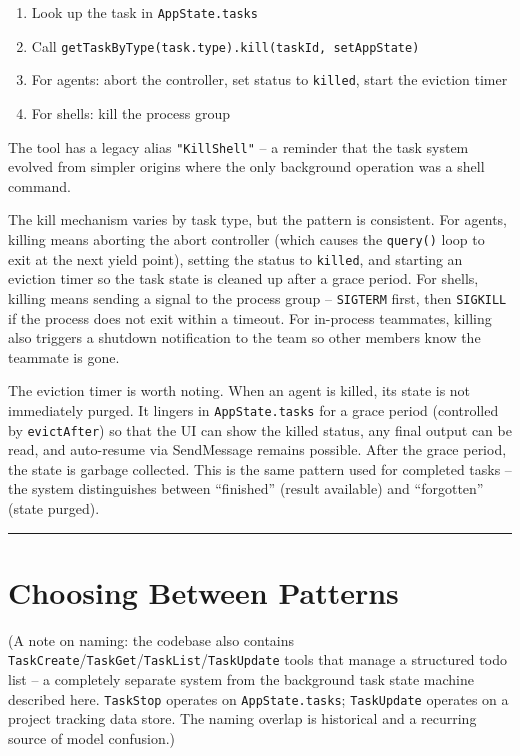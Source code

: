 \documentclass[
  english,
  11pt,
  letterpaper,
]{book}
\providecommand{\tightlist}{%
  \setlength{\itemsep}{0pt}\setlength{\parskip}{0pt}}
\begin{document}
\begin{enumerate}
\def\labelenumi{\arabic{enumi}.}
\tightlist
\item
  Look up the task in \texttt{AppState.tasks}
\item
  Call \texttt{getTaskByType(task.type).kill(taskId,\ setAppState)}
\item
  For agents: abort the controller, set status to
  \texttt{\textquotesingle{}killed\textquotesingle{}}, start the
  eviction timer
\item
  For shells: kill the process group
\end{enumerate}

The tool has a legacy alias \texttt{"KillShell"} -- a reminder that the
task system evolved from simpler origins where the only background
operation was a shell command.

The kill mechanism varies by task type, but the pattern is consistent.
For agents, killing means aborting the abort controller (which causes
the \texttt{query()} loop to exit at the next yield point), setting the
status to \texttt{\textquotesingle{}killed\textquotesingle{}}, and
starting an eviction timer so the task state is cleaned up after a grace
period. For shells, killing means sending a signal to the process group
-- \texttt{SIGTERM} first, then \texttt{SIGKILL} if the process does not
exit within a timeout. For in-process teammates, killing also triggers a
shutdown notification to the team so other members know the teammate is
gone.

The eviction timer is worth noting. When an agent is killed, its state
is not immediately purged. It lingers in \texttt{AppState.tasks} for a
grace period (controlled by \texttt{evictAfter}) so that the UI can show
the killed status, any final output can be read, and auto-resume via
SendMessage remains possible. After the grace period, the state is
garbage collected. This is the same pattern used for completed tasks --
the system distinguishes between ``finished'' (result available) and
``forgotten'' (state purged).

\begin{center}\rule{0.5\linewidth}{0.5pt}\end{center}

\section{Choosing Between Patterns}\label{choosing-between-patterns}

(A note on naming: the codebase also contains
\texttt{TaskCreate}/\texttt{TaskGet}/\texttt{TaskList}/\texttt{TaskUpdate}
tools that manage a structured todo list -- a completely separate system
from the background task state machine described here. \texttt{TaskStop}
operates on \texttt{AppState.tasks}; \texttt{TaskUpdate} operates on a
project tracking data store. The naming overlap is historical and a
recurring source of model confusion.)
\end{document}
